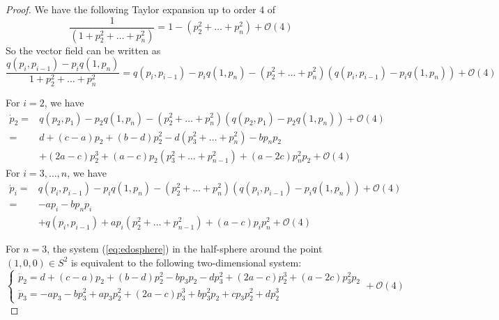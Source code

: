 \documentclass[10pt,a4paper]{amsart}
\begin{document}
\begin{proof}
We have the following Taylor expansion up to order $4$ of 
$$\dfrac{1}{(1+p_2^2+\dots + p_n^2)}=1-(p_2^2+\dots + p_n^2)+\mathcal{O}(4)$$
So the vector field can be written as 
$$\dfrac{q(p_i,p_{i-1})-p_i q(1,p_n)}{1+p_2^2+\dots +p_n^2}=q(p_i,p_{i-1})-p_i q(1,p_n)-(p_2^2+\dots +p_n^2)(q(p_i,p_{i-1})-p_i q(1,p_n))+\mathcal{O}(4)$$

For $i=2$, we have 
\begin{align*}
\dot{p}_2=&q(p_2,p_1)-p_2 q(1,p_n)-(p_2^2+\dots +p_n^2)(q(p_2,p_1)-p_2 q(1,p_n))+\mathcal{O}(4)\\
 =&d+(c-a)p_2+(b-d)p_2^2 -d(p_3^2+\dots +p_n^2) -b p_n p_2\\
 & +(2a-c) p_2^3 +(a-c) p_2(p_3^2+\dots +p_{n-1}^2) +(a-2c)p_n^2 p_2 +\mathcal{O}(4)
\end{align*}
For $i=3,\dots,n$, we have 
\begin{align*}
\dot{p}_i	=&q(p_i,p_{i-1})-p_i q(1,p_n)-(p_2^2+\dots +p_n^2)(q(p_i,p_{i-1})-p_i q(1,p_n))+\mathcal{O}(4)\\
					=& -ap_i -bp_np_i\\
					&+q(p_i,p_{i-1})+a p_i(p_2^2+\dots +p_{n-1}^2)+(a-c)p_i p_n^2 +\mathcal{O}(4) 
\end{align*}

For $n=3$, the system (\ref{eq:edosphere}) in the half-sphere around the point $(1,0,0)\in S^2$ is equivalent to the following two-dimensional system:
$$\begin{cases}
\dot{p}_2=d+(c-a)p_2+(b-d)p_2^2  -b p_3 p_2-d p_3^2+(2a-c) p_2^3 +(a-2c)p_3^2 p_2 \\
\dot{p}_3	= -a p_3- bp_3^2+a p_3 p_2^2+(2a-c)p_3^3+bp_3^2p_2+cp_3p_2^2+dp_2^3 
\end{cases}+\mathcal{O}(4)
$$


\end{proof}
\end{document}
